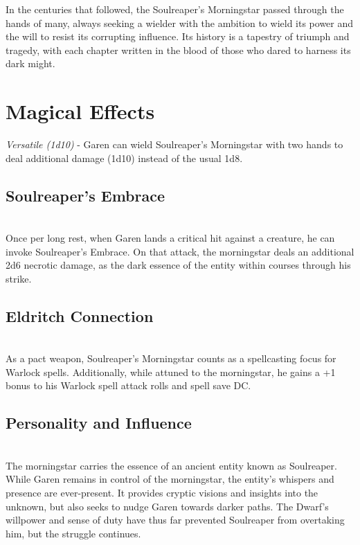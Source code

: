 In the centuries that followed, the Soulreaper's Morningstar passed through the hands of many, always seeking a wielder with the ambition to wield its power and the will to resist its corrupting influence. Its history is a tapestry of triumph and tragedy, with each chapter written in the blood of those who dared to harness its dark might.

\section*{Magical Effects}
\textit{Versatile (1d10)} - Garen can wield Soulreaper's Morningstar with two hands to deal additional damage (1d10) instead of the usual 1d8.
\subsection*{Soulreaper's Embrace}\hfill\\
Once per long rest, when Garen lands a critical hit against a creature, he can invoke Soulreaper's Embrace. On that attack, the morningstar deals an additional 2d6 necrotic damage, as the dark essence of the entity within courses through his strike.
\subsection*{Eldritch Connection}\hfill\\
As a pact weapon, Soulreaper's Morningstar counts as a spellcasting focus for Warlock spells. Additionally, while attuned to the morningstar, he gains a +1 bonus to his Warlock spell attack rolls and spell save DC.
\subsection*{Personality and Influence}\hfill\\
The morningstar carries the essence of an ancient entity known as Soulreaper. While Garen remains in control of the morningstar, the entity's whispers and presence are ever-present. It provides cryptic visions and insights into the unknown, but also seeks to nudge Garen towards darker paths. The Dwarf's willpower and sense of duty have thus far prevented Soulreaper from overtaking him, but the struggle continues.
